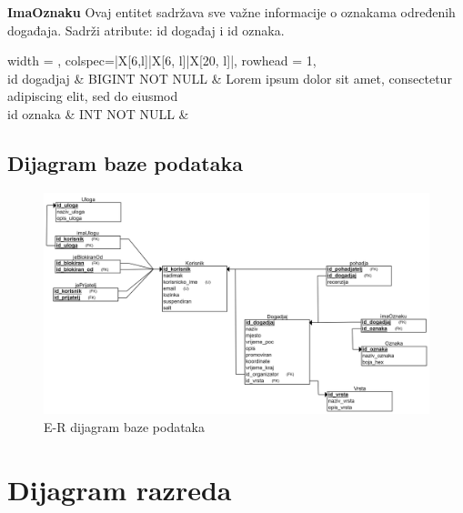 				
				\noindent\textbf{ImaOznaku} Ovaj entitet sadržava sve važne informacije o oznakama određenih događaja. Sadrži atribute: id događaj i id oznaka.
				
				\begin{longtblr}[
					label=none,
					entry=none
					]{
						width = \textwidth,
						colspec={|X[6,l]|X[6, l]|X[20, l]|}, 
						rowhead = 1,
					} %
					\hline {}	 \\ \hline[3pt]
					id dogadjaj & BIGINT NOT NULL	&  	Lorem ipsum dolor sit amet, consectetur adipiscing elit, sed do eiusmod  	\\ \hline
					id oznaka	& INT NOT NULL &   	\\ \hline 
				
				\end{longtblr}
			
				
			
			
				
				
			
			\subsection{Dijagram baze podataka}
				
				
			\begin{figure}[h]
				\includegraphics[width=\textwidth]{dijagrami/Baza podataka/REL shema.png}
				\caption{E-R dijagram baze podataka}
			\end{figure}
				
			\eject
			
			
		\section{Dijagram razreda}
			

